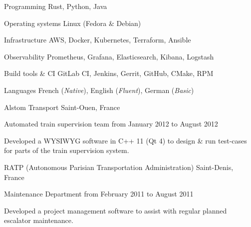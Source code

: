 \documentclass[10pt, a4paper]{awesome-cv}
\begin{document}
\begin{cvskills}
	\cvskill
	{Programming}
	{Rust, Python, Java}

	\cvskill
	{Operating systems}
	{Linux (Fedora \& Debian)}

	\cvskill
	{Infrastructure}
	{AWS, Docker, Kubernetes, Terraform, Ansible}

	\cvskill
	{Observability}
	{Prometheus, Grafana, Elasticsearch, Kibana, Logstash}

	\cvskill
	{Build tools \& CI}
	{GitLab CI, Jenkins, Gerrit, GitHub, CMake, RPM}

	\cvskill
	{Languages}
	{French (\emph{Native}), English (\emph{Fluent}), German (\emph{Basic})}
\end{cvskills}

\newpage
{}


\begin{cventries}

	\cventrytitle
	{Alstom Transport}
	{Saint-Ouen, France}

	\cventry
	{Automated train supervision team}
	{from January 2012 to August 2012}
	{
		\begin{cvparagraph}
			Developed a WYSIWYG software in C++ 11 (Qt 4) to design \& run test-cases for parts of the train supervision system.
		\end{cvparagraph}
		\vspace{4pt}
	}

	\cventrytitle
	{RATP (Autonomous Parisian Transportation Administration)}
	{Saint-Denis, France}

	\cventry
	{Maintenance Department}
	{from February 2011 to August 2011}
	{
		\begin{cvparagraph}
			Developed a project management software to assist with regular planned escalator maintenance.
		\end{cvparagraph}
	}

\end{cventries}

\end{document}
